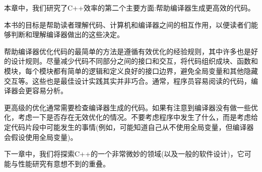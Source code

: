 本章中，我们研究了C++效率的第二个主要方面:帮助编译器生成更高效的代码。 

本书的目标是帮助读者理解代码、计算机和编译器之间的相互作用，以便读者们能够判断和理解编译器做出的这些决定。 

帮助编译器优化代码的最简单的方法是遵循有效优化的经验规则，其中许多也是好的设计规则。尽量减少代码不同部分之间的接口和交互，将代码组织成块、函数和模块，每个模块都有简单的逻辑和定义良好的接口边界，避免全局变量和其他隐藏交互等。这些也是最佳设计实践其实并非巧合。通常，程序员容易阅读的代码，编译器会更容易分析。

更高级的优化通常需要检查编译器生成的代码。如果有注意到编译器没有做一些优化，考虑一下是否存在无效优化的情况。不要考虑程序中发生了什么，而是考虑给定代码片段中可能发生的事情(例如，可能知道自己从不使用全局变量，但编译器会假设使用全局变量)。 

下一章中，我们将探索C++的一个非常微妙的领域(以及一般的软件设计)，它可能与性能研究有意想不到的重叠。